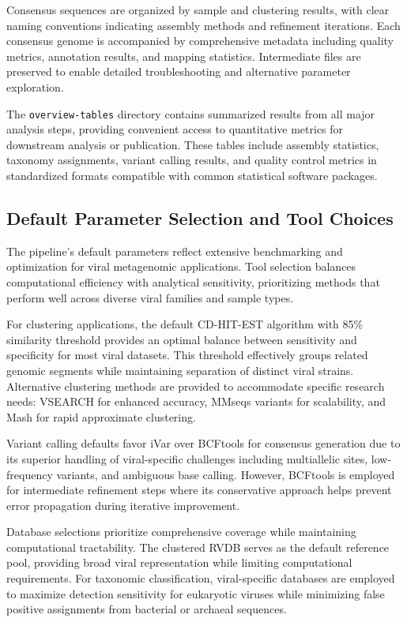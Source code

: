 \documentclass[unnumsec,webpdf,contemporary,large]{oup-authoring-template}%
\theoremstyle{thmstyleone}%
\theoremstyle{thmstyletwo}%
\theoremstyle{thmstylethree}%
\begin{document}
Consensus sequences are organized by sample and clustering results, with clear naming conventions indicating assembly methods and refinement iterations. Each consensus genome is accompanied by comprehensive metadata including quality metrics, annotation results, and mapping statistics. Intermediate files are preserved to enable detailed troubleshooting and alternative parameter exploration.

The \texttt{overview-tables} directory contains summarized results from all major analysis steps, providing convenient access to quantitative metrics for downstream analysis or publication. These tables include assembly statistics, taxonomy assignments, variant calling results, and quality control metrics in standardized formats compatible with common statistical software packages.

\subsection{Default Parameter Selection and Tool Choices}\label{subsec_parameters}

The pipeline's default parameters reflect extensive benchmarking and optimization for viral metagenomic applications. Tool selection balances computational efficiency with analytical sensitivity, prioritizing methods that perform well across diverse viral families and sample types.

For clustering applications, the default CD-HIT-EST \cite{Li2006-nj} algorithm with 85\% similarity threshold provides an optimal balance between sensitivity and specificity for most viral datasets. This threshold effectively groups related genomic segments while maintaining separation of distinct viral strains. Alternative clustering methods are provided to accommodate specific research needs: VSEARCH \cite{Rognes2016-ju} for enhanced accuracy, MMseqs variants for scalability, and Mash \cite{Ondov2019-bo} for rapid approximate clustering.

Variant calling defaults favor iVar over BCFtools for consensus generation due to its superior handling of viral-specific challenges including multiallelic sites, low-frequency variants, and ambiguous base calling. However, BCFtools is employed for intermediate refinement steps where its conservative approach helps prevent error propagation during iterative improvement.

Database selections prioritize comprehensive coverage while maintaining computational tractability. The clustered RVDB serves as the default reference pool, providing broad viral representation while limiting computational requirements. For taxonomic classification, viral-specific databases are employed to maximize detection sensitivity for eukaryotic viruses while minimizing false positive assignments from bacterial or archaeal sequences.
\end{document}
